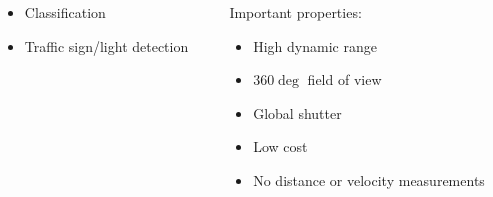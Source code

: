 \begin{frame}
\begin{columns}[T]
\begin{column}{.5\textwidth}
\begin{columns}[T]
\begin{column}{0.45\textwidth}
\begin{itemize}
                    \item Classification
                    \item Traffic sign/light detection
                \end{itemize}
            \end{column}
            \begin{column}{0.55\textwidth}
                \footnotesize
                Important properties:
                \begin{itemize}
                    \item High dynamic range
                    \item $360\deg$ field of view
                    \item Global shutter
                    \item Low cost
                    \item No distance or velocity measurements
                \end{itemize}
            \end{column}
        \end{columns}
    \end{column}
\end{columns}

\end{frame}

